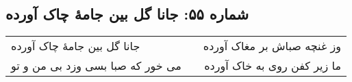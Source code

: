 \begin{center}
\section*{شماره ۵۵: جانا گل بین جامۀ چاک آورده}
\label{sec:055}
\begin{longtable}{l p{0.5cm} r}
جانا گل بین جامهٔ چاک آورده
&&
وز غنچه صباش بر مغاک آورده
\\
می خور که صبا بسی وزد بی من و تو
&&
ما زیر کفن روی به خاک آورده
\\
\end{longtable}
\end{center}
